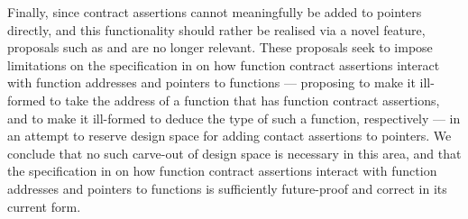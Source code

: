 Finally, since contract assertions cannot meaningfully be added to pointers directly, and this functionality should rather be realised via a novel feature, proposals such as \cite{P3221R0} and \cite{P3250R0} are no longer relevant. These proposals seek to impose limitations on the specification in \cite{P2900R7} on how function contract assertions interact with function addresses and pointers to functions --- proposing to make it ill-formed to take the address of a function that has function contract assertions, and to make it ill-formed to deduce the type of such a function, respectively --- in an attempt to reserve design space for adding  contact assertions to pointers. We conclude that no such carve-out of design space is necessary in this area, and that the specification in \cite{P2900R7} on how function contract assertions interact with function addresses and pointers to functions is sufficiently future-proof and correct in its current form.





\pagebreak %


\renewcommand{\addcontentsline}[3]{}%







